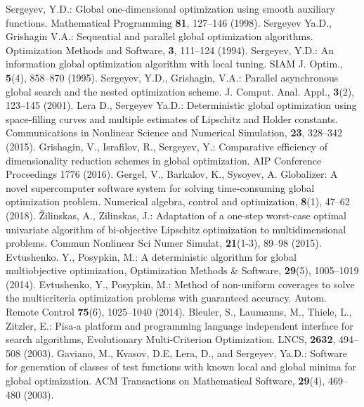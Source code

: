 \documentclass[runningheads]{llncs}
\begin{document}
\begin{thebibliography}{1}
 Sergeyev, Y.D.: Global one-dimensional optimization using smooth auxiliary functions. Mathematical Programming \textbf{81}, 127--146 (1998).
 Sergeyev Ya.D., Grishagin V.A.: Sequential and parallel global optimization algorithms. Optimization Methods and Software, \textbf{3}, 111--124 (1994).
 Sergeyev, Y.D.: An information global optimization algorithm with local tuning. SIAM J. Optim., \textbf{5}(4), 858--870 (1995).
 Sergeyev, Y.D., Grishagin, V.A.: Parallel asynchronous global search and the nested optimization scheme. J. Comput. Anal. Appl., \textbf{3}(2), 123--145 (2001).
 Lera D., Sergeyev Ya.D.: Deterministic global optimization using space-filling curves and multiple estimates of Lipschitz and Holder constants. Communications in Nonlinear Science and Numerical Simulation, \textbf{23}, 328--342 (2015).
 Grishagin, V., Israfilov, R., Sergeyev, Y.: Comparative efficiency of dimensionality reduction schemes in global optimization. AIP Conference Proceedings 1776 (2016).
 Gergel, V., Barkalov, K., Sysoyev, A. Globalizer: A novel supercomputer software system for solving time-consuming global optimization problem. Numerical algebra, control and optimization, \textbf{8}(1), 47--62 (2018).
 {\v Z}ilinskas, A., Zilinskas, J.: Adaptation of a one-step worst-case optimal univariate algorithm of bi-objective Lipschitz optimization to multidimensional problems. Commun Nonlinear Sci Numer Simulat, \textbf{21}(1-3), 89--98 (2015). 
 Evtushenko. Y., Posypkin, M.: A deterministic algorithm for global multiobjective optimization, Optimization Methods \& Software, \textbf{29}(5), 1005--1019 (2014). 
 Evtushenko, Y., Posypkin, M.: Method of non-uniform coverages to solve the multicriteria optimization problems with guaranteed accuracy. Autom. Remote Control \textbf{75}(6), 1025--1040 (2014).
 Bleuler, S., Laumanns, M., Thiele, L., Zitzler, E.: Pisa-a platform and programming language independent interface for search algorithms, Evolutionary Multi-Criterion Optimization. LNCS, \textbf{2632}, 494--508 (2003). 
 Gaviano, M., Kvasov, D.E, Lera, D., and Sergeyev, Ya.D.: Software for generation of classes of test functions with known local and global minima for global optimization. ACM Transactions on Mathematical Software, \textbf{29}(4), 469--480 (2003).


\end{thebibliography}


%
\end{document}
